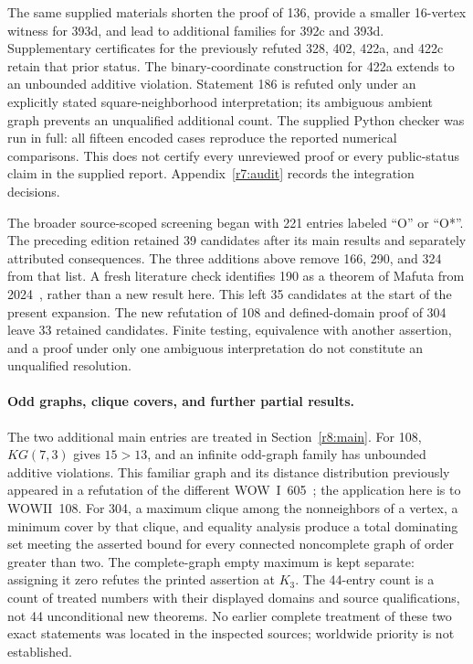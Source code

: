 \documentclass[11pt,a4paper]{article}
\theoremstyle{remark}
\begin{document}
The same supplied materials shorten the proof of 136, provide a smaller
16-vertex witness for 393d, and lead to additional families for 392c and
393d. Supplementary certificates for the previously refuted 328, 402,
422a, and 422c retain that prior status. The binary-coordinate construction
for 422a extends to an unbounded additive violation. Statement 186 is
refuted only under an explicitly stated square-neighborhood interpretation;
its ambiguous ambient graph prevents an unqualified additional count.
The supplied Python checker was run in full: all fifteen encoded cases
reproduce the reported numerical comparisons. This does not certify every
unreviewed proof or every public-status claim in the supplied report.
Appendix~\ref{r7:audit} records the integration decisions.

The broader source-scoped screening began with 221 entries labeled
``O'' or ``O*''. The preceding edition retained 39 candidates after its
main results and separately attributed consequences. The three additions
above remove 166, 290, and 324 from that list. A fresh literature check
identifies 190 as a theorem of Mafuta from 2024~\cite{Mafuta24}, rather
than a new result here. This left 35 candidates at the start of the
present expansion. The new refutation of 108 and defined-domain proof
of 304 leave 33 retained candidates. Finite testing, equivalence with
another assertion, and a proof under only one ambiguous interpretation
do not constitute an unqualified resolution.

\paragraph{Odd graphs, clique covers, and further partial results.}
The two additional main entries are treated in Section~\ref{r8:main}.
For 108, $KG(7,3)$ gives $15>13$, and an infinite odd-graph family
has unbounded additive violations. This familiar graph and its distance
distribution previously appeared in a refutation of the different
WOW~I~605~\cite[\S7h]{AuditR8}; the application here is to WOWII~108.
For 304, a maximum clique among the nonneighbors of a vertex, a minimum
cover by that clique, and equality analysis produce a total dominating
set meeting the asserted bound for every connected noncomplete graph
of order greater than two. The complete-graph empty maximum is kept
separate: assigning it zero refutes the printed assertion at $K_3$.
The 44-entry count is a count of treated numbers with their displayed
domains and source qualifications, not 44 unconditional new theorems.
No earlier complete treatment of these two exact statements was located
in the inspected sources; worldwide priority is not established.
\end{document}
